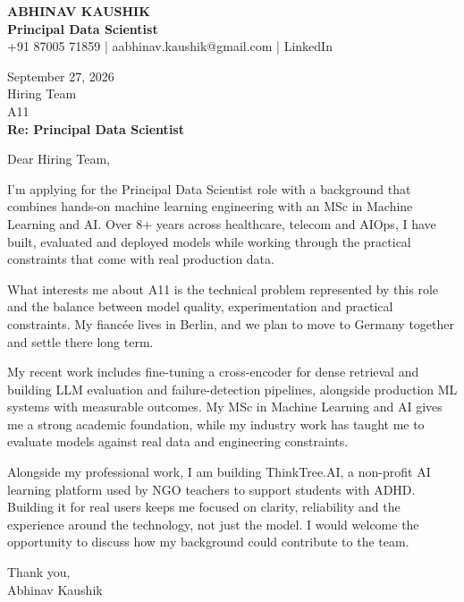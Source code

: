 \documentclass[10pt,a4paper]{article}
\begin{document}
\begin{center}
{\Large\bfseries ABHINAV KAUSHIK}\\[2pt]
{\bfseries Principal Data Scientist}\\[2pt]
+91 87005 71859 \quad | \quad aabhinav.kaushik@gmail.com \quad | \quad LinkedIn
\end{center}
\vspace{8pt}
September 27, 2026\\[6pt]
Hiring Team\\
A11\\[4pt]
\textbf{Re: Principal Data Scientist}

Dear Hiring Team,

I’m applying for the Principal Data Scientist role with a background that combines hands-on machine learning engineering with an MSc in Machine Learning and AI. Over 8+ years across healthcare, telecom and AIOps, I have built, evaluated and deployed models while working through the practical constraints that come with real production data.

What interests me about A11 is the technical problem represented by this role and the balance between model quality, experimentation and practical constraints. My fiancée lives in Berlin, and we plan to move to Germany together and settle there long term.

My recent work includes fine-tuning a cross-encoder for dense retrieval and building LLM evaluation and failure-detection pipelines, alongside production ML systems with measurable outcomes. My MSc in Machine Learning and AI gives me a strong academic foundation, while my industry work has taught me to evaluate models against real data and engineering constraints.

Alongside my professional work, I am building ThinkTree.AI, a non-profit AI learning platform used by NGO teachers to support students with ADHD. Building it for real users keeps me focused on clarity, reliability and the experience around the technology, not just the model. I would welcome the opportunity to discuss how my background could contribute to the team.

Thank you,\\
Abhinav Kaushik
\end{document}
